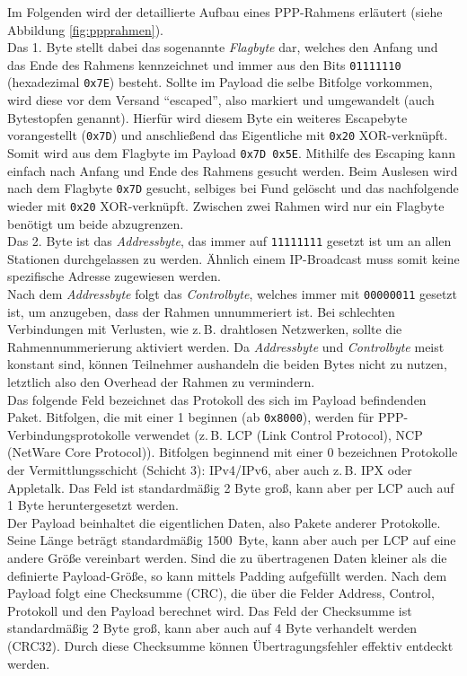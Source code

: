 \documentclass[journal,11pt]{IEEEtran}
\begin{document}
Im Folgenden wird der detaillierte Aufbau eines PPP-Rahmens erläutert (siehe Abbildung \ref{fig:ppprahmen}).\\
Das 1. Byte stellt dabei das sogenannte \textit{Flagbyte} dar, welches den Anfang und das Ende des Rahmens kennzeichnet und immer aus den Bits \texttt{01111110} (hexadezimal \texttt{0x7E}) besteht. Sollte im Payload die selbe Bitfolge vorkommen, wird diese vor dem Versand ``escaped'', also markiert und umgewandelt (auch Bytestopfen genannt). Hierfür wird diesem Byte ein weiteres Escapebyte vorangestellt (\texttt{0x7D}) und anschließend das Eigentliche mit \texttt{0x20} XOR-verknüpft. Somit wird aus dem Flagbyte im Payload \texttt{0x7D 0x5E}. Mithilfe des Escaping kann einfach nach Anfang und Ende des Rahmens gesucht werden. Beim Auslesen wird nach dem Flagbyte \texttt{0x7D} gesucht, selbiges bei Fund gelöscht und das nachfolgende wieder mit \texttt{0x20} XOR-verknüpft. Zwischen zwei Rahmen wird nur ein Flagbyte benötigt um beide abzugrenzen.\\
Das 2. Byte ist das \textit{Addressbyte}, das immer auf \texttt{11111111} gesetzt ist um an allen Stationen durchgelassen zu werden. Ähnlich einem IP-Broadcast muss somit keine spezifische Adresse zugewiesen werden.\\
Nach dem \textit{Addressbyte} folgt das \textit{Controlbyte}, welches immer mit \texttt{00000011} gesetzt ist, um anzugeben, dass der Rahmen unnummeriert ist. Bei schlechten Verbindungen mit Verlusten, wie z.\,B. drahtlosen Netzwerken, sollte die Rahmennummerierung aktiviert werden. Da \textit{Addressbyte} und \textit{Controlbyte} meist konstant sind, können Teilnehmer aushandeln die beiden Bytes nicht zu nutzen, letztlich also den Overhead der Rahmen zu vermindern.\\
Das folgende Feld bezeichnet das Protokoll des sich im Payload befindenden Paket. Bitfolgen, die mit einer 1 beginnen (ab \texttt{0x8000}), werden für PPP-Verbindungsprotokolle verwendet (z.\,B. LCP (Link Control Protocol), NCP (NetWare Core Protocol)). Bitfolgen beginnend mit einer 0 bezeichnen Protokolle der Vermittlungsschicht (Schicht 3): IPv4/IPv6, aber auch z.\,B. IPX oder Appletalk. Das Feld ist standardmäßig 2 Byte groß, kann aber per LCP auch auf 1 Byte heruntergesetzt werden.\\
Der Payload beinhaltet die eigentlichen Daten, also Pakete anderer Protokolle. Seine Länge beträgt standardmäßig 1500~Byte, kann aber auch per LCP auf eine andere Größe vereinbart werden. Sind die zu übertragenen Daten kleiner als die definierte Payload-Größe, so kann mittels Padding aufgefüllt werden.
Nach dem Payload folgt eine Checksumme (CRC), die über die Felder Address, Control, Protokoll und den Payload berechnet wird. Das Feld der Checksumme ist standardmäßig 2 Byte groß, kann aber auch auf 4 Byte verhandelt werden (CRC32). Durch diese Checksumme können Übertragungsfehler effektiv entdeckt werden.
\end{document}
